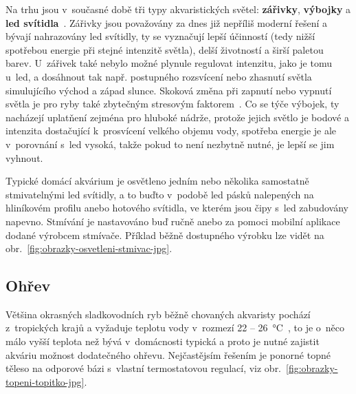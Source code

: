         Na trhu jsou v~současné době tři typy akvaristických světel: \textbf{zářivky}, \textbf{výbojky}  a \textbf{\acs{led} svítidla}~\cite{eshop-rostlinna-akvaria-svetlo}. Zářivky jsou považovány za dnes již nepříliš moderní řešení a bývají nahrazovány \acs{led} svítidly, ty se vyznačují lepší účinností (tedy nižší spotřebou energie při stejné intenzitě světla), delší životností a širší paletou barev. U~zářivek také nebylo možné plynule regulovat intenzitu, jako je tomu u~\acs{led}, a dosáhnout tak např. postupného rozsvícení nebo zhasnutí světla simulujícího východ a západ slunce. Skoková změna při zapnutí nebo vypnutí světla je pro ryby také zbytečným stresovým faktorem~\cite{MusilLibor2018Isps}. Co se týče výbojek, ty nacházejí uplatňení zejména pro hluboké nádrže, protože jejich světlo je bodové a intenzita dostačující k~prosvícení velkého objemu vody, spotřeba energie je ale v~porovnání s~\acs{led} vysoká, takže pokud to není nezbytně nutné, je lepší se jim vyhnout.   

        Typické domácí akvárium je osvětleno jedním nebo několika samostatně stmivatelnými \acs{led} svítidly, a to buďto v~podobě \acs{led} pásků nalepených na hliníkovém profilu anebo hotového svítidla, ve kterém jsou čipy s~\acs{led} zabudovány napevno. Stmívání je nastavováno buď ručně anebo za pomoci mobilní aplikace dodané výrobcem stmívače. Příklad běžně dostupného výrobku lze vidět na obr.~\ref{fig:obrazky-osvetleni-stmivac-jpg}.

    \subsection{Ohřev}
        Většina okrasných sladkovodních ryb běžně chovaných akvaristy pochází z~tropických krajů a vyžaduje teplotu vody v~rozmezí 22 -- \qty{26}{\degreeCelsius}~\cite{slavotinek2014}, to je o~něco málo vyšší teplota než bývá v~domácnosti typická a proto je nutné zajistit akváriu možnost dodatečného ohřevu. Nejčastějsím řešením je ponorné topné těleso na odporové bázi s~vlastní termostatovou regulací, viz obr.~\ref{fig:obrazky-topeni-topitko-jpg}.

